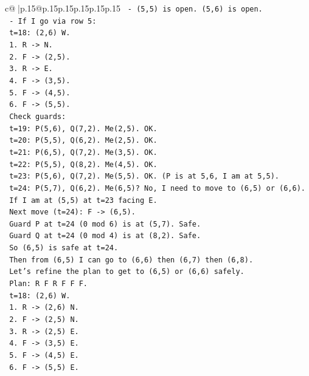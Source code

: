 \documentclass{article}
\begin{document}
{\begin{supertabular}{c@{$\;$}|p{.15\linewidth}@{}p{.15\linewidth}p{.15\linewidth}p{.15\linewidth}p{.15\linewidth}p{.15\linewidth}}
{{{\texttt{  {-} (5,5) is open. (5,6) is open.} \\
\texttt{  {-} If I go via row 5:} \\
\texttt{    t=18: (2,6) W.} \\
\texttt{    1. R {-}> N.} \\
\texttt{    2. F {-}> (2,5).} \\
\texttt{    3. R {-}> E.} \\
\texttt{    4. F {-}> (3,5).} \\
\texttt{    5. F {-}> (4,5).} \\
\texttt{    6. F {-}> (5,5).} \\
\texttt{    Check guards:} \\
\texttt{    t=19: P(5,6), Q(7,2). Me(2,5). OK.} \\
\texttt{    t=20: P(5,5), Q(6,2). Me(2,5). OK.} \\
\texttt{    t=21: P(6,5), Q(7,2). Me(3,5). OK.} \\
\texttt{    t=22: P(5,5), Q(8,2). Me(4,5). OK.} \\
\texttt{    t=23: P(5,6), Q(7,2). Me(5,5). OK. (P is at 5,6, I am at 5,5).} \\
\texttt{    t=24: P(5,7), Q(6,2). Me(6,5)? No, I need to move to (6,5) or (6,6).} \\
\texttt{    If I am at (5,5) at t=23 facing E.} \\
\texttt{    Next move (t=24): F {-}> (6,5).} \\
\texttt{    Guard P at t=24 (0 mod 6) is at (5,7). Safe.} \\
\texttt{    Guard Q at t=24 (0 mod 4) is at (8,2). Safe.} \\
\texttt{    So (6,5) is safe at t=24.} \\
\texttt{    Then from (6,5) I can go to (6,6) then (6,7) then (6,8).} \\
\texttt{    Let's refine the plan to get to (6,5) or (6,6) safely.} \\
\texttt{    Plan: R F R F F F.} \\
\texttt{    t=18: (2,6) W.} \\
\texttt{    1. R {-}> (2,6) N.} \\
\texttt{    2. F {-}> (2,5) N.} \\
\texttt{    3. R {-}> (2,5) E.} \\
\texttt{    4. F {-}> (3,5) E.} \\
\texttt{    5. F {-}> (4,5) E.} \\
\texttt{    6. F {-}> (5,5) E.} \\
}}}
\end{supertabular}}
\end{document}
